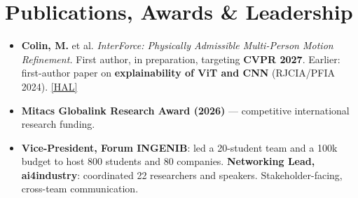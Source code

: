 \documentclass[10pt, letterpaper]{article}
\begin{document}
\section{Publications, Awards \& Leadership}
\begin{itemize}
    \item \textbf{Colin, M.} et al. \textit{InterForce: Physically Admissible Multi-Person Motion Refinement.} First author, in preparation, targeting \textbf{CVPR 2027}. Earlier: first-author paper on \textbf{explainability of ViT and CNN} (RJCIA/PFIA 2024). \hfill \href{https://hal.science/hal-04641791}{[HAL]}
    \item \textbf{Mitacs Globalink Research Award (2026)} --- competitive international research funding.
    \item \textbf{Vice-President, Forum INGENIB}: led a 20-student team and a \texteuro{}100k budget to host 800 students and 80 companies. \textbf{Networking Lead, ai4industry}: coordinated 22 researchers and speakers. Stakeholder-facing, cross-team communication.
\end{itemize}
\end{document}
